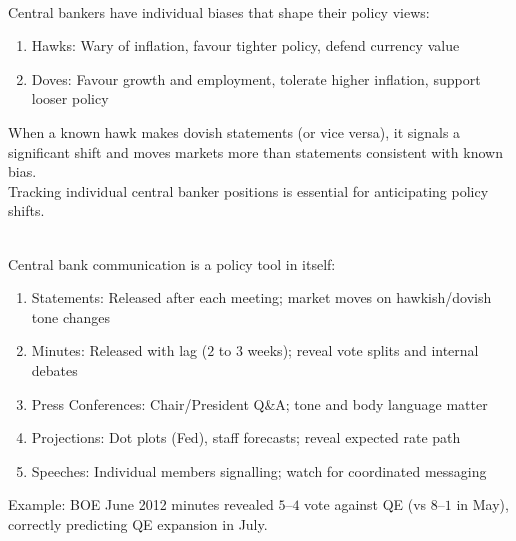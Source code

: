 \documentclass[a4paper,oneside,openany]{book}
\begin{document}
\begin{remark} \\
Central bankers have individual biases that shape their policy views:
\begin{enumerate}[label=\roman*.]
\setlength{\itemsep}{0pt}
\item Hawks: Wary of inflation, favour tighter policy, defend currency value
\item Doves: Favour growth and employment, tolerate higher inflation, support looser policy
\end{enumerate}
When a known hawk makes dovish statements (or vice versa), it signals a significant shift and moves markets more than statements consistent with known bias.\\
Tracking individual central banker positions is essential for anticipating policy shifts.
\end{remark}

\begin{remark} \\
Central bank communication is a policy tool in itself:
\begin{enumerate}[label=\roman*.]
\setlength{\itemsep}{0pt}
\item Statements: Released after each meeting; market moves on hawkish/dovish tone changes
\item Minutes: Released with lag ($2$ to $3$ weeks); reveal vote splits and internal debates
\item Press Conferences: Chair/President Q\&A; tone and body language matter
\item Projections: Dot plots (Fed), staff forecasts; reveal expected rate path
\item Speeches: Individual members signalling; watch for coordinated messaging
\end{enumerate}
Example: BOE June 2012 minutes revealed $5$--$4$ vote against QE (vs $8$--$1$ in May), correctly predicting QE expansion in July.
\end{remark}
\end{document}
